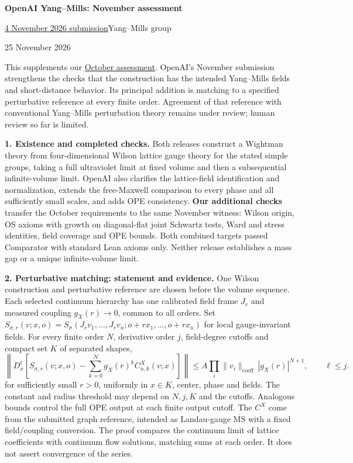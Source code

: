 \documentclass[11pt]{article}
\begin{document}
\begin{center}
{\Large\bfseries OpenAI Yang--Mills: November assessment}\par
\vspace{3pt}
\href{https://github.com/yang-mills-group/OpenAI-YM-20261104/tree/c1bb5a5566b2bad9d593980d470439f815895317/}{4 November 2026 submission}\quad\textbullet\quad Yang--Mills group\par
{\small 25 November 2026}
\end{center}
\vspace{-4pt}

This supplements our \href{https://github.com/yang-mills-group/YM/blob/main/docs/assessment-1.pdf}{October assessment}.
OpenAI's November submission strengthens the checks that the construction has
the intended Yang--Mills fields and short-distance behavior. Its principal
addition is matching to a specified perturbative reference at every finite
order. Agreement of that reference with conventional Yang--Mills perturbation
theory remains under review; human review so far is limited.

\textbf{1. Existence and completed checks.}
Both releases construct a Wightman theory from four-dimensional Wilson lattice
gauge theory for the stated simple groups, taking a full ultraviolet limit at
fixed volume and then a subsequential infinite-volume limit. OpenAI also clarifies
the lattice-field identification and normalization, extends the free-Maxwell
comparison to every phase and all sufficiently small scales, and adds OPE consistency.
\textbf{Our additional checks} transfer the October requirements to the same
November witness: Wilson origin,
OS axioms with growth on diagonal-flat joint Schwartz tests, Ward and stress
identities, field coverage and OPE bounds. Both combined targets passed
Comparator with standard Lean axioms only. Neither release establishes a mass
gap or a unique infinite-volume limit.

\textbf{2. Perturbative matching: statement and evidence.}
One Wilson construction and perturbative reference are chosen before the
volume sequence. Each selected continuum hierarchy has one calibrated field
frame $J_r$ and measured coupling $g_X(r)\to0$, common to all orders. Set
$S_{\sigma,r}(v;x,o)=S_\sigma(J_rv_1,\ldots,J_rv_n;o+rx_1,\ldots,o+rx_n)$
for local gauge-invariant fields. For every finite order $N$, derivative order
$j$, field-degree cutoffs and compact set $K$ of separated shapes,
\[
 \left\|D_x^\ell\!\left[S_{\sigma,r}(v;x,o)
       -\sum_{k=0}^{N}g_X(r)^k C^X_{n,k}(v;x)\right]\right\|
 \le A\!\prod_i\|v_i\|_{\mathrm{coeff}}\,|g_X(r)|^{N+1},
 \qquad \ell\le j.
\]
for sufficiently small $r>0$, uniformly in $x\in K$, center, phase and fields.
The constant and radius threshold may depend on $N,j,K$ and the cutoffs.
Analogous bounds control the full OPE output at each finite output cutoff.
The $C^X$ come from the submitted graph reference, intended as Landau-gauge
$\overline{\mathrm{MS}}$ with a fixed field/coupling conversion. The proof compares the
continuum limit of lattice coefficients with continuum flow solutions,
matching sums at each order. It does not assert convergence of the series.
\end{document}
